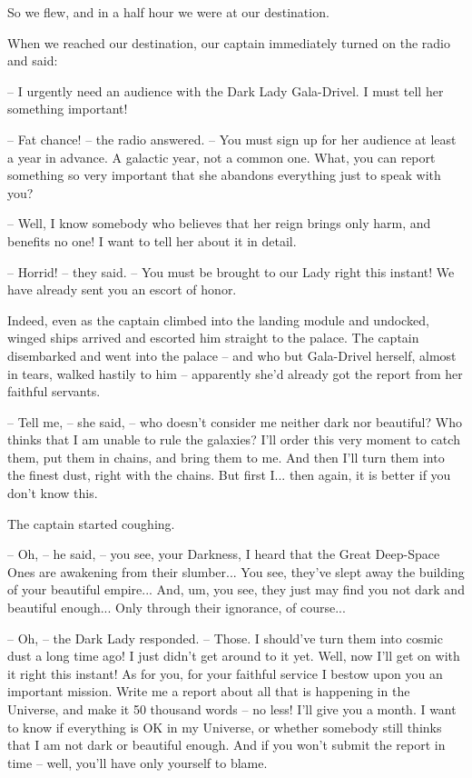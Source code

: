 \documentclass[ebook,twoside,final,openright]{memoir}
\begin{document}
So we flew, and in a half hour we were at our destination.\par
\par
When we reached our destination, our captain immediately turned on the radio and said:\par
– I urgently need an audience with the Dark Lady Gala-Drivel. I must tell her something important! \par
– Fat chance! – the radio answered. – You must sign up for her audience at least a year in advance. A galactic year, not a common one. What, you can report something so very important that she abandons everything just to speak with you?\par
– Well, I know somebody who believes that her reign brings only harm, and benefits no one! I want to tell her about it in detail.\par
– Horrid! – they said. – You must be brought to our Lady right this instant! We have already sent you an escort of honor.\par
\par
Indeed, even as the captain climbed into the landing module and undocked, winged ships arrived and escorted him straight to the palace. The captain disembarked and went into the palace – and who but Gala-Drivel herself, almost in tears, walked hastily to him – apparently she’d already got the report from her faithful servants.\par
– Tell me, – she said, – who doesn’t consider me neither dark nor beautiful? Who thinks that I am unable to rule the galaxies? I’ll order this very moment to catch them, put them in chains, and bring them to me. And then I’ll turn them into the finest dust, right with the chains. But first I... then again, it is better if you don’t know this.\par
The captain started coughing.\par
– Oh, – he said, – you see, your Darkness, I heard that the Great Deep-Space Ones are awakening from their slumber... You see, they’ve slept away the building of your beautiful empire... And, um, you see, they just may find you not dark and beautiful enough... Only through their ignorance, of course...\par
– Oh, – the Dark Lady responded. – Those. I should’ve turn them into cosmic dust a long time ago! I just didn’t get around to it yet. Well, now I’ll get on with it right this instant! As for you, for your faithful service I bestow upon you an important mission. Write me a report about all that is happening in the Universe, and make it 50 thousand words – no less! I’ll give you a month. I want to know if everything is OK in my Universe, or whether somebody still thinks that I am not dark or beautiful enough. And if you won’t submit the report in time – well, you’ll have only yourself to blame.\par
\end{document}
